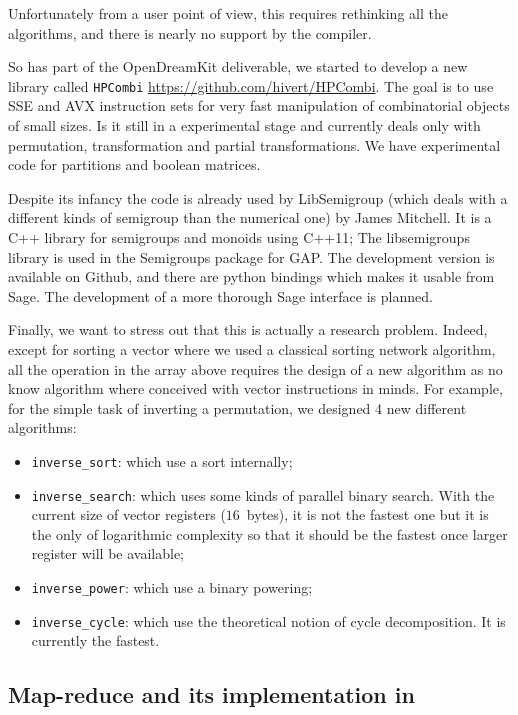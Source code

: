 \documentclass{deliverablereport}
\begin{document}
Unfortunately from a user point of view, this requires rethinking all the
algorithms, and there is nearly no support by the compiler.\bigskip

So has part of the OpenDreamKit deliverable, we started to develop a new
library called \texttt{HPCombi} \url{https://github.com/hivert/HPCombi}. The
goal is to use SSE and AVX instruction sets for very fast manipulation of
combinatorial objects of small sizes. Is it still in a experimental stage and
currently deals only with permutation, transformation and partial
transformations. We have experimental code for partitions and boolean
matrices.

Despite its infancy the code is already used by LibSemigroup
\cite{libsemigroup} (which deals with a different kinds of semigroup than the
numerical one) by James Mitchell. It is a C++ library for semigroups and
monoids using C++11; The libsemigroups library is used in the Semigroups
package for GAP. The development version is available on Github, and there are
python bindings which makes it usable from Sage. The development of a more
thorough Sage interface is planned.

Finally, we want to stress out that this is actually a research
problem. Indeed, except for sorting a vector where we used a classical sorting
network algorithm, all the operation in the array above requires the design of
a new algorithm as no know algorithm where conceived with vector instructions
in minds. For example, for the simple task of inverting a permutation, we
designed 4 new different algorithms:
\begin{itemize}
\item \verb|inverse_sort|: which use a sort internally;
\item \verb|inverse_search|: which uses some kinds of parallel binary search. With
  the current size of vector registers ($16$~bytes), it is not the fastest one
  but it is the only of logarithmic complexity so that it should be the
  fastest once larger register will be available;
\item \verb|inverse_power|: which use a binary powering;
\item \verb|inverse_cycle|: which use the theoretical notion of cycle
  decomposition. It is currently the fastest.
\end{itemize}


\subsection{Map-reduce and its implementation in \Sage}
\label{subsec:map-reduce:Sage}
\end{document}
